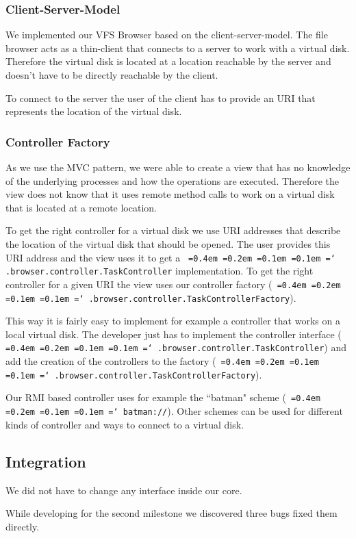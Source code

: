 \documentclass[a4paper,12pt]{article}
\newcommand*\justify{%
  \fontdimen2\font=0.4em%
  \fontdimen3\font=0.2em%
  \fontdimen4\font=0.1em%
  \fontdimen7\font=0.1em%
  \hyphenchar\font=`\-%
}
\newcommand{\mono}[1]{\texttt{\justify #1}}
\begin{document}
\subsubsection{Client-Server-Model}
We implemented our VFS Browser based on the client-server-model. The file browser acts as a thin-client that connects to a server to work with a virtual disk. Therefore the virtual disk is located at a location reachable by the server and doesn't have to be directly reachable by the client.

To connect to the server the user of the client has to provide an URI that represents the location of the virtual disk.

\subsubsection{Controller Factory}
As we use the MVC pattern, we were able to create a view that has no knowledge of the underlying processes and how the operations are executed. Therefore the view does not know that it uses remote method calls to work on a virtual disk that is located at a remote location.

To get the right controller for a virtual disk we use URI addresses that describe the location of the virtual disk that should be opened. The user provides this URI address and the view uses it to get a \mono{.browser.controller.TaskController} implementation. To get the right controller for a given URI the view uses our controller factory (\mono{.browser.controller.TaskControllerFactory}).

This way it is fairly easy to implement for example a controller that works on a local virtual disk. The developer just has to implement the controller interface (\mono{.browser.controller.TaskController}) and add the creation of the controllers to the factory (\mono{.browser.controller.TaskControllerFactory}).

Our RMI based controller uses for example the ``batman" scheme (\mono{batman://}). Other schemes can be used for different kinds of controller and ways to connect to a virtual disk.

\subsection{Integration}
We did not have to change any interface inside our core.

While developing for the second milestone we discovered three bugs fixed them directly.
\end{document}
